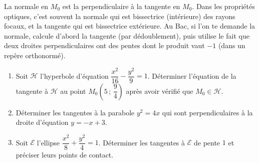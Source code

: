 \documentclass[11pt]{article}
\newcommand{\cle}[1]{{\popxbold\color{popdark}#1}}
\begin{document}
\begin{attention}
La \cle{normale} en $M_0$ est la perpendiculaire à la tangente en $M_0$. Dans les propriétés optiques, c'est souvent la normale qui est bissectrice (intérieure) des rayons focaux, et la tangente qui est bissectrice extérieure. Au Bac, si l'on te demande la normale, calcule d'abord la tangente (par dédoublement), puis utilise le fait que deux droites perpendiculaires ont des pentes dont le produit vaut $-1$ (dans un repère orthonormé).
\end{attention}

\begin{exercice}
\begin{enumerate}
\item Soit $\mathcal{H}$ l'hyperbole d'équation $\dfrac{x^2}{16} - \dfrac{y^2}{9} = 1$. Déterminer l'équation de la tangente à $\mathcal{H}$ au point $M_0\left(5\,;\,\dfrac{9}{4}\right)$ après avoir vérifié que $M_0 \in \mathcal{H}$.
\item Déterminer les tangentes à la parabole $y^2 = 4x$ qui sont perpendiculaires à la droite d'équation $y = -x + 3$.
\item Soit $\mathcal{E}$ l'ellipse $\dfrac{x^2}{8} + \dfrac{y^2}{4} = 1$. Déterminer les tangentes à $\mathcal{E}$ de pente $1$ et préciser leurs points de contact.
\end{enumerate}
\end{exercice}
\end{document}
